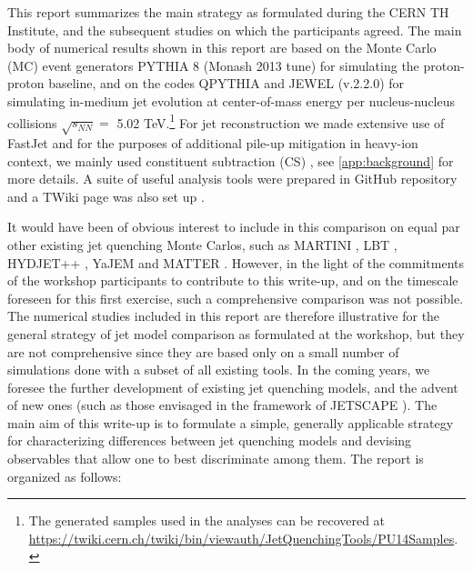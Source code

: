 This report summarizes the main strategy as formulated during the CERN TH Institute, and the subsequent studies on which the participants agreed. 
The main body of numerical results shown in this report are based 
on  the Monte Carlo (MC) event generators PYTHIA 8 \cite{Sjostrand:2007gs}  (Monash 2013 tune) for simulating the proton-proton baseline, and on the 
codes QPYTHIA \cite{Armesto:2009fj} and JEWEL (v.2.2.0) \cite{Zapp:2011ya,Zapp:2012ak} for simulating in-medium jet evolution at center-of-mass energy per nucleus-nucleus collisions $\sqrt{s_{NN}}=$ 5.02 TeV.\footnote{The generated samples used in the analyses can be recovered at \url{https://twiki.cern.ch/twiki/bin/viewauth/JetQuenchingTools/PU14Samples}.}
For jet reconstruction we made extensive use of FastJet \cite{Cacciari:2005hq,Cacciari:2011ma} and for the purposes of additional pile-up mitigation in heavy-ion context, we mainly used constituent subtraction (CS) \cite{Berta:2014eza}, see \autoref{app:background} for more details. A suite of useful analysis tools were prepared in GitHub repository \cite{cerninstitute-github} and a TWiki page was also set up \cite{cerninstitute-twiki}.

It would have been of obvious interest to include in this comparison on equal par other existing jet quenching Monte Carlos, such as MARTINI \cite{Schenke:2009gb,Young:2011ug}, LBT \cite{Wang:2013cia,He:2015pra}, HYDJET++ \cite{Lokhtin:2008xi}, YaJEM \cite{Renk:2010zx} and MATTER \cite{Majumder:2013re}. However, in the light of the commitments of the workshop participants 
to contribute to this write-up, and on the timescale foreseen for this first exercise, such a comprehensive comparison was not possible. 
The numerical studies included in this report are therefore illustrative for the general strategy of jet model comparison as formulated at the workshop, 
but they are not comprehensive since they are based only on a small number of simulations done with a subset of all existing tools. In the coming years,
we  foresee the further development of existing jet quenching models, and the advent of new ones (such as those envisaged in the framework of 
JETSCAPE \cite{Cao:2017zih}). The main aim of this write-up is to formulate a simple, generally applicable strategy for characterizing differences
between jet quenching models and devising observables that allow one to best discriminate among them. The report is organized as follows:

